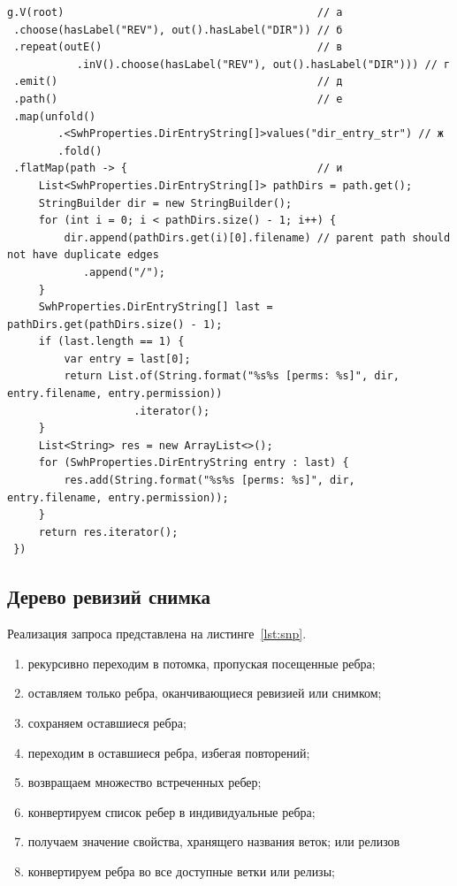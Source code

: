 \documentclass[times,specification,annotation]{itmo-student-thesis}
\begin{document}
\begin{lstlisting}[float=H,caption={Список файлов ревизии на Gremlin},label={lst:rec}]
g.V(root)                                        // а
 .choose(hasLabel("REV"), out().hasLabel("DIR")) // б
 .repeat(outE()                                  // в
           .inV().choose(hasLabel("REV"), out().hasLabel("DIR"))) // г
 .emit()                                         // д
 .path()                                         // е
 .map(unfold()
        .<SwhProperties.DirEntryString[]>values("dir_entry_str") // ж
        .fold()
 .flatMap(path -> {                              // и
     List<SwhProperties.DirEntryString[]> pathDirs = path.get();
     StringBuilder dir = new StringBuilder();
     for (int i = 0; i < pathDirs.size() - 1; i++) {
         dir.append(pathDirs.get(i)[0].filename) // parent path should not have duplicate edges
            .append("/");
     }
     SwhProperties.DirEntryString[] last = pathDirs.get(pathDirs.size() - 1);
     if (last.length == 1) {
         var entry = last[0];
         return List.of(String.format("%s%s [perms: %s]", dir, entry.filename, entry.permission))
                    .iterator();
     }
     List<String> res = new ArrayList<>();
     for (SwhProperties.DirEntryString entry : last) {
         res.add(String.format("%s%s [perms: %s]", dir, entry.filename, entry.permission));
     }
     return res.iterator();
 })
\end{lstlisting}

\subsection{Дерево ревизий снимка}

Реализация запроса представлена на листинге~\ref{lst:snp}.
\begin{enumerate}
    \item рекурсивно переходим в потомка, пропуская посещенные ребра;
    \item оставляем только ребра, оканчивающиеся ревизией или снимком;
    \item сохраняем оставшиеся ребра;
    \item переходим в оставшиеся ребра, избегая повторений;
    \item возвращаем множество встреченных ребер;
    \item конвертируем список ребер в индивидуальные ребра;
    \item получаем значение свойства, хранящего названия веток; или релизов
    \item конвертируем ребра во все доступные ветки или релизы;
\end{enumerate}
\end{document}
